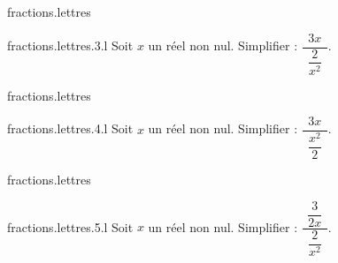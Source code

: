\begin{qcm}{fractions.lettres}
\begin{question}{fractions.lettres.3.l}
         Soit \(x\) un réel non nul. Simplifier : \( \dfrac{3x}{~~\dfrac{2}{x^2}~~}\).
         \begin{multicols}{3}
            \begin{reponses}
         \end{reponses}
         \setcounter{unbalance}{1}
         \end{multicols}
    \end{question}
\end{qcm}

\begin{qcm}{fractions.lettres}
\begin{question}{fractions.lettres.4.l}
         Soit \(x\) un réel non nul. Simplifier : \( \dfrac{3x}{~~\dfrac{x^2}{2}~~}\).
         \begin{multicols}{3}
            \begin{reponses}
         \end{reponses}
         \setcounter{unbalance}{1}
         \end{multicols}
    \end{question}
\end{qcm}


\begin{qcm}{fractions.lettres}
\begin{question}{fractions.lettres.5.l}
         Soit \(x\) un réel non nul. Simplifier : \( \dfrac{\dfrac{3}{2x}}{~~\dfrac{2}{x^2}~~}\).
         \begin{multicols}{3}
            \begin{reponses}
         \end{reponses}
         \setcounter{unbalance}{1}
         \end{multicols}
    \end{question}
\end{qcm}
